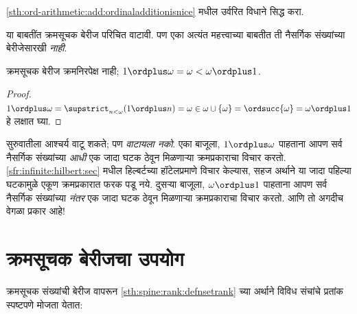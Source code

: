 \begin{prob}
\ref{sth:ord-arithmetic:add:ordinaladditionisnice} मधील उर्वरित विधाने सिद्ध करा.
\end{prob}

या बाबतींत क्रमसूचक बेरीज परिचित वाटावी. पण एका अत्यंत महत्त्वाच्या बाबतीत ती नैसर्गिक संख्यांच्या बेरीजेसारखी \emph{नाही}.

\begin{prop}\label{sth:ord-arithmetic:add:ordsumnotcommute}
क्रमसूचक बेरीज {क्रमनिरपेक्ष नाही}; $1 \ordplus  \omega = \omega <
\omega \ordplus  1$.
\end{prop}

\begin{proof}
$1 \ordplus  \omega = \supstrict_{n < \omega} (1 \ordplus n)
= \omega \in \omega \cup \{\omega\} = \ordsucc{\omega} = \omega
\ordplus  1$ हे लक्षात घ्या.
\end{proof}
\noindent
सुरुवातीला आश्चर्य वाटू शकते; पण \emph{वाटायला नको}. एका बाजूला, $1 \ordplus  \omega$ पाहताना आपण सर्व नैसर्गिक संख्यांच्या \emph{आधी} एक जादा घटक ठेवून मिळणाऱ्या क्रमप्रकाराचा विचार करतो. \ref{sfr:infinite:hilbert:sec} मधील हिल्बर्टच्या हॉटेलप्रमाणे विचार केल्यास, सहज अर्थाने या जादा पहिल्या घटकामुळे एकूण क्रमप्रकारात फरक पडू नये. दुसऱ्या बाजूला, $\omega \ordplus  1$ पाहताना आपण सर्व नैसर्गिक संख्यांच्या \emph{नंतर} एक जादा घटक ठेवून मिळणाऱ्या क्रमप्रकाराचा विचार करतो. आणि तो अगदीच वेगळा प्रकार आहे!







\section{क्रमसूचक बेरीजचा उपयोग}\label{sth:ord-arithmetic:using-addition:sec}

क्रमसूचक संख्यांची बेरीज वापरून \ref{sth:spine:rank:defnsetrank} च्या अर्थाने विविध संचांचे प्रतांक स्पष्टपणे मोजता येतात:

